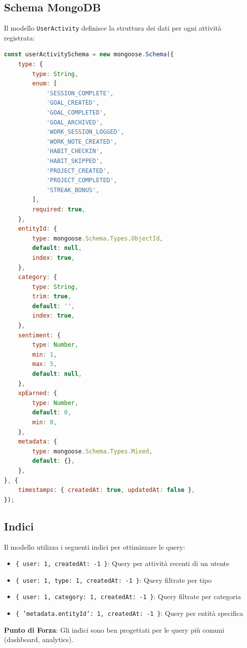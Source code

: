 \documentclass[11pt,a4paper]{article}
\begin{document}
\subsection{Schema MongoDB}

Il modello \texttt{UserActivity} definisce la struttura dei dati per ogni attività registrata:

\begin{lstlisting}[language=JavaScript, caption=Schema UserActivity]
const userActivitySchema = new mongoose.Schema({
    type: {
        type: String,
        enum: [
            'SESSION_COMPLETE',
            'GOAL_CREATED',
            'GOAL_COMPLETED',
            'GOAL_ARCHIVED',
            'WORK_SESSION_LOGGED',
            'WORK_NOTE_CREATED',
            'HABIT_CHECKIN',
            'HABIT_SKIPPED',
            'PROJECT_CREATED',
            'PROJECT_COMPLETED',
            'STREAK_BONUS',
        ],
        required: true,
    },
    entityId: {
        type: mongoose.Schema.Types.ObjectId,
        default: null,
        index: true,
    },
    category: {
        type: String,
        trim: true,
        default: '',
        index: true,
    },
    sentiment: {
        type: Number,
        min: 1,
        max: 5,
        default: null,
    },
    xpEarned: {
        type: Number,
        default: 0,
        min: 0,
    },
    metadata: {
        type: mongoose.Schema.Types.Mixed,
        default: {},
    },
}, {
    timestamps: { createdAt: true, updatedAt: false },
});
\end{lstlisting}

\subsection{Indici}

Il modello utilizza i seguenti indici per ottimizzare le query:

\begin{itemize}
    \item \texttt{\{ user: 1, createdAt: -1 \}}: Query per attività recenti di un utente
    \item \texttt{\{ user: 1, type: 1, createdAt: -1 \}}: Query filtrate per tipo
    \item \texttt{\{ user: 1, category: 1, createdAt: -1 \}}: Query filtrate per categoria
    \item \texttt{\{ 'metadata.entityId': 1, createdAt: -1 \}}: Query per entità specifica
\end{itemize}

\textbf{Punto di Forza}: Gli indici sono ben progettati per le query più comuni (dashboard, analytics).
\end{document}
